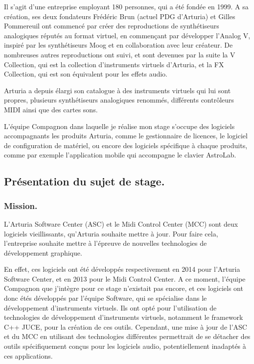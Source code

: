 \documentclass[francais]{rapportPFE}  %
\begin{document}
Il s'agit d'une entreprise employant 180 personnes, qui a été fondée en 1999. A sa création, ses deux fondateurs Frédéric Brun (actuel PDG d'Arturia) et Gilles Pommereuil ont commencé par créer des reproductions de synthétiseurs analogiques réputés au format virtuel, en commençant par développer l'Analog V, inspiré par les synthétiseurs Moog et en collaboration avec leur créateur. De nombreuses autres reproductions ont suivi, et sont devenues par la suite la V Collection, qui est la collection d'instruments virtuels d'Arturia, et la FX Collection, qui est son équivalent pour les effets audio.

Arturia a depuis élargi son catalogue à des instruments virtuels qui lui sont propres, plusieurs synthétiseurs analogiques renommés, différents contrôleurs MIDI ainsi que des cartes sons. 

L’équipe Compagnon dans laquelle je réalise mon stage s’occupe des logiciels accompagnants les produits Arturia, comme le gestionnaire de licences, le logiciel de configuration de matériel, ou encore des logiciels spécifique à chaque produits, comme par exemple l'application mobile qui accompagne le clavier AstroLab. 

\subsection{Présentation du sujet de stage.}


\subsubsection{Mission.}

L'Arturia Software Center (ASC) et le Midi Control Center (MCC) sont deux logiciels vieillissants, qu'Arturia souhaite mettre à jour. Pour faire cela, l'entreprise souhaite mettre à l'épreuve de nouvelles technologies de développement graphique.

En effet, ces logiciels ont été développés respectivement en 2014 pour l'Arturia Software Center, et en 2013 pour le Midi Control Center. A ce moment, l'équipe Compagnon que j'intègre pour ce stage n'existait pas encore, et ces logiciels ont donc étés développés par l'équipe Software, qui se spécialise dans le développement d'instruments virtuels. Ils ont opté pour l'utilisation de technologies de développement d'instruments virtuels, notamment le framework C++ JUCE, pour la création de ces outils. Cependant, une mise à jour de l'ASC et du MCC en utilisant des technologies différentes permettrait de se détacher des outils spécifiquement conçus pour les logiciels audio, potentiellement inadaptés à ces applications.
\end{document}
